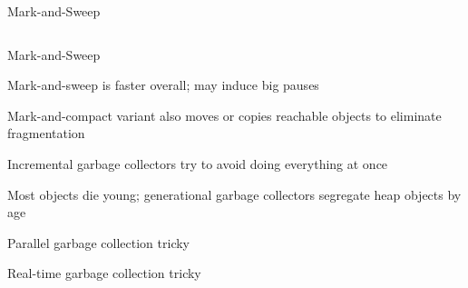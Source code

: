 \documentclass{plt}
\begin{document}
\begin{frame}[fragile,t]{Mark-and-Sweep}
\begin{columns}[t]
\begin{column}{0.6\textwidth}
\end{column}
\end{columns}

\end{frame}

\begin{frame}{Mark-and-Sweep}
\baselineskip

Mark-and-sweep is faster overall; may induce big pauses

Mark-and-compact variant also moves or copies reachable objects to
eliminate fragmentation

Incremental garbage collectors try to avoid doing everything at once

Most objects die young; generational garbage collectors segregate heap
objects by age

Parallel garbage collection tricky

Real-time garbage collection tricky

\end{frame}
%
%
%
%
%
%
\end{document}
